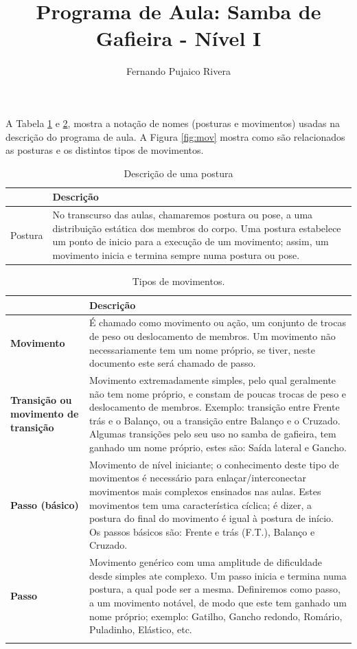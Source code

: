 \documentclass[12pt, a4paper]{article}
\title{Programa de Aula: Samba de Gafieira - Nível I}
\author{Fernando Pujaico Rivera}
\date{}
\begin{document}
{\let\newpage\relax\maketitle}
A Tabela \ref{tab:typospos} e \ref {tab:typosmov}, mostra a notação de nomes  (posturas e movimentos) usadas 
na descrição do programa de aula.
A Figura \ref{fig:mov} mostra como são relacionados as posturas e os distintos tipos de movimentos.


\begin{table}[h]
\centering
\begin{tabular}{|p{3cm}|p{13cm}|}
\hline
~ & Descrição \\  \hline
Postura & No transcurso das aulas, chamaremos postura ou pose, a uma distribuição estática
dos membros do corpo. Uma postura estabelece um ponto de inicio para a execução de um
movimento; assim, um movimento inicia e termina sempre numa postura ou pose.\\ \hline

\end{tabular}
\caption{Descrição de uma postura}
\label{tab:typospos}
\end{table}


\begin{longtable}{|p{2.5cm}|p{13.5cm}|}
\hline
~ & Descrição \\  \hline
\textbf{Movimento} & É chamado como movimento ou ação, um conjunto de trocas de peso ou deslocamento de membros.
Um movimento não necessariamente tem um nome próprio, se tiver, neste documento este será
chamado de passo.\\ \hline
\textbf{Transição ou movimento de transição} &  Movimento extremadamente simples, pelo qual geralmente não tem nome próprio,
e constam de poucas trocas de peso e deslocamento de membros. Exemplo: transição entre Frente trás e o Balanço, 
ou a transição entre Balanço e o Cruzado. Algumas transições
pelo seu uso no samba de gafieira, tem ganhado um nome próprio, estes são: Saída lateral e Gancho.\\ \hline
\textbf{Passo (básico)} & Movimento de nível iniciante; o conhecimento deste tipo de
movimentos é necessário para enlaçar/interconectar movimentos mais complexos ensinados nas aulas. Estes
movimentos tem uma característica cíclica; é dizer, a postura do final do movimento 
é igual à postura de início. Os passos básicos são: Frente e trás (F.T.), Balanço e Cruzado.\\ \hline
\textbf{Passo} &  Movimento genérico com uma amplitude de dificuldade desde simples ate complexo.
Um passo inicia e termina numa postura, a qual pode ser a mesma. Definiremos como passo, a um movimento
notável, de modo que este tem ganhado um nome próprio; exemplo: Gatilho, Gancho redondo, Romário, Puladinho, Elástico, etc. \\ \hline
\caption{Tipos de movimentos.}
\label{tab:typosmov}
\end{longtable}
\end{document}
